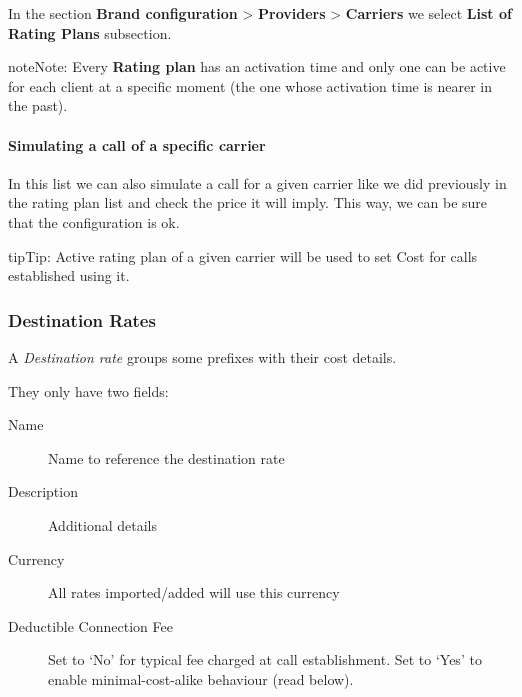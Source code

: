 \documentclass[letterpaper,10pt,english]{sphinxmanual}
\begin{document}
In the section \textbf{Brand configuration} \textgreater{} \textbf{Providers} \textgreater{} \textbf{Carriers} we select \textbf{List of Rating Plans} subsection.

\begin{notice}{note}{Note:}
Every \textbf{Rating plan} has an activation time and only one can be active for each
client at a specific moment (the one whose activation time is nearer in the past).
\end{notice}
\paragraph{Simulating a call of a specific carrier}

In this list we can also simulate a call for a given carrier like we did previously
in the rating plan list and check the price it will imply. This way, we can be sure
that the configuration is ok.

\begin{notice}{tip}{Tip:}
Active rating plan of a given carrier will be used to set Cost for calls established using it.
\end{notice}


\subsubsection{Destination Rates}
\label{administration_portal/brand/billing/destination_rates:destination-rates}\label{administration_portal/brand/billing/destination_rates::doc}\label{administration_portal/brand/billing/destination_rates:destination-rate}
A \emph{Destination rate} groups some prefixes with their cost details.

They only have two fields:
\begin{description}
\item[{Name}] \leavevmode{}\label{administration_portal/brand/billing/destination_rates:term-name}
Name to reference the destination rate

\item[{Description}] \leavevmode{}\label{administration_portal/brand/billing/destination_rates:term-description}
Additional details

\item[{Currency}] \leavevmode{}\label{administration_portal/brand/billing/destination_rates:term-currency}
All rates imported/added will use this currency

\item[{Deductible Connection Fee}] \leavevmode{}\label{administration_portal/brand/billing/destination_rates:term-deductible-connection-fee}
Set to `No' for typical fee charged at call establishment. Set to `Yes' to enable
minimal-cost-alike behaviour (read below).

\end{description}
\end{document}
